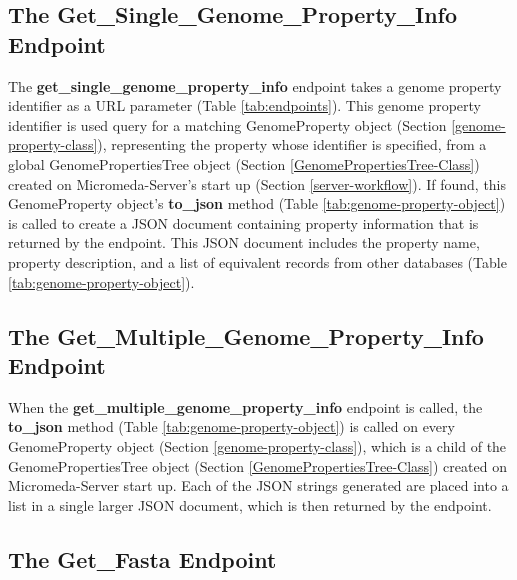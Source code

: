 \subsection{The Get\_Single\_Genome\_Property\_Info Endpoint} \label{get-property-info-endpoint}

The \textbf{get\_single\_genome\_property\_info} endpoint takes a genome property identifier as a URL parameter (Table \ref{tab:endpoints}). This genome property identifier is used query for a matching GenomeProperty object (Section \ref{genome-property-class}), representing the property whose identifier is specified, from a global GenomePropertiesTree object (Section \ref{GenomePropertiesTree-Class}) created on Micromeda-Server's start up (Section \ref{server-workflow}). If found, this GenomeProperty object's \textbf{to\_json} method (Table \ref{tab:genome-property-object}) is called to create a JSON document containing property information that is returned by the endpoint. This JSON document includes the property name, property description, and a list of equivalent records from other databases (Table \ref{tab:genome-property-object}).

\subsection{The Get\_Multiple\_Genome\_Property\_Info Endpoint}

When the \textbf{get\_multiple\_genome\_property\_info} endpoint is called, the \textbf{to\_json} method (Table \ref{tab:genome-property-object}) is called on every GenomeProperty object (Section \ref{genome-property-class}), which is a child of the GenomePropertiesTree object (Section \ref{GenomePropertiesTree-Class}) created on Micromeda-Server start up. Each of the JSON strings generated are placed into a list in a single larger JSON document, which is then returned by the endpoint. 

\subsection{The Get\_Fasta Endpoint} \label{get-fasta-endpoint}

